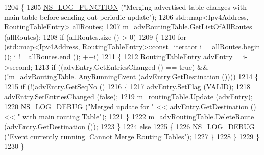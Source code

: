\begin{DoxyCode}
1204 \{
1205   \hyperlink{log-macros-disabled_8h_a90b90d5bad1f39cb1b64923ea94c0761}{NS\_LOG\_FUNCTION} (\textcolor{stringliteral}{"Merging advertised table changes with main table before sending out
       periodic update"});
1206   std::map<Ipv4Address, RoutingTableEntry> allRoutes;
1207   \hyperlink{classns3_1_1dsdv_1_1RoutingProtocol_adce3cf63777d6099e58caa1cb198282c}{m\_advRoutingTable}.\hyperlink{classns3_1_1dsdv_1_1RoutingTable_af980697df819d8a00ee8782c705e3dac}{GetListOfAllRoutes} (allRoutes);
1208   \textcolor{keywordflow}{if} (allRoutes.size () > 0)
1209     \{
1210       \textcolor{keywordflow}{for} (std::map<Ipv4Address, RoutingTableEntry>::const\_iterator \hyperlink{bernuolliDistribution_8m_a6f6ccfcf58b31cb6412107d9d5281426}{i} = allRoutes.begin (); 
      \hyperlink{bernuolliDistribution_8m_a6f6ccfcf58b31cb6412107d9d5281426}{i} != allRoutes.end (); ++\hyperlink{bernuolliDistribution_8m_a6f6ccfcf58b31cb6412107d9d5281426}{i})
1211         \{
1212           RoutingTableEntry advEntry = \hyperlink{bernuolliDistribution_8m_a6f6ccfcf58b31cb6412107d9d5281426}{i}->second;
1213           \textcolor{keywordflow}{if} ((advEntry.GetEntriesChanged () == \textcolor{keyword}{true}) && (!\hyperlink{classns3_1_1dsdv_1_1RoutingProtocol_adce3cf63777d6099e58caa1cb198282c}{m\_advRoutingTable}.
      \hyperlink{classns3_1_1dsdv_1_1RoutingTable_acb9f117332351347f8345d4591991e6b}{AnyRunningEvent} (advEntry.GetDestination ())))
1214             \{
1215               \textcolor{keywordflow}{if} (!(advEntry.GetSeqNo () %
1216                 \{
1217                   advEntry.SetFlag (\hyperlink{namespacens3_1_1dsdv_aa1c39555b993cc6f56f2c8c6c31e2c3baf2cbf3d202d1c7338230c662e6822e65}{VALID});
1218                   advEntry.SetEntriesChanged (\textcolor{keyword}{false});
1219                   \hyperlink{classns3_1_1dsdv_1_1RoutingProtocol_acc4cee466c2591e35f508ce58097a00e}{m\_routingTable}.\hyperlink{classns3_1_1dsdv_1_1RoutingTable_a651762730975f809c720313b1332cb99}{Update} (advEntry);
1220                   \hyperlink{group__logging_ga413f1886406d49f59a6a0a89b77b4d0a}{NS\_LOG\_DEBUG} (\textcolor{stringliteral}{"Merged update for "} << advEntry.GetDestination () << \textcolor{stringliteral}{" with
       main routing Table"});
1221                 \}
1222               \hyperlink{classns3_1_1dsdv_1_1RoutingProtocol_adce3cf63777d6099e58caa1cb198282c}{m\_advRoutingTable}.\hyperlink{classns3_1_1dsdv_1_1RoutingTable_a384f271a1393c513c4ae7ba4476c3e08}{DeleteRoute} (advEntry.GetDestination ());
1223             \}
1224           \textcolor{keywordflow}{else}
1225             \{
1226               \hyperlink{group__logging_ga413f1886406d49f59a6a0a89b77b4d0a}{NS\_LOG\_DEBUG} (\textcolor{stringliteral}{"Event currently running. Cannot Merge Routing Tables"});
1227             \}
1228         \}
1229     \}
1230 \}
\end{DoxyCode}



